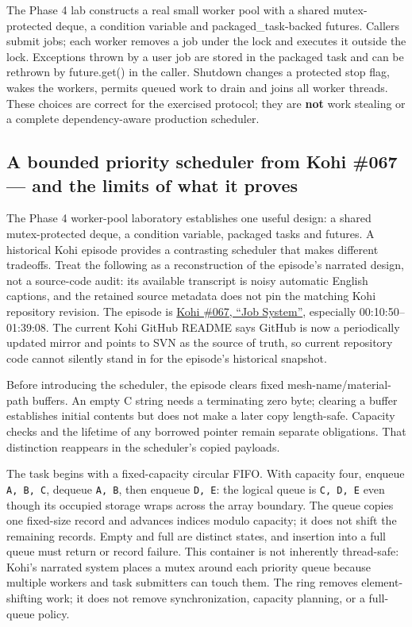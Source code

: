The Phase 4 lab constructs a real small worker pool with a shared mutex-protected deque, a condition variable and packaged\_task-backed futures. Callers submit jobs; each worker removes a job under the lock and executes it outside the lock. Exceptions thrown by a user job are stored in the packaged task and can be rethrown by future.get() in the caller. Shutdown changes a protected stop flag, wakes the workers, permits queued work to drain and joins all worker threads. These choices are correct for the exercised protocol; they are \textbf{not} work stealing or a complete dependency-aware production scheduler.

\subsection{A bounded priority scheduler from Kohi \#067 --- and the limits of what it proves}\label{05-engine-i-ch007-a-bounded-priority-scheduler-from-kohi-067-and-the-limits-of-what-it-proves}

The Phase 4 worker-pool laboratory establishes one useful design: a shared mutex-protected deque, a condition variable, packaged tasks and futures. A historical Kohi episode provides a contrasting scheduler that makes different tradeoffs. Treat the following as a reconstruction of the episode's narrated design, not a source-code audit: its available transcript is noisy automatic English captions, and the retained source metadata does not pin the matching Kohi repository revision. The episode is \href{https://www.youtube.com/watch?v=3JbLqoDubIY}{Kohi \#067, ``Job System''}, especially 00:10:50--01:39:08. The current Kohi GitHub README says GitHub is now a periodically updated mirror and points to SVN as the source of truth, so current repository code cannot silently stand in for the episode's historical snapshot.

Before introducing the scheduler, the episode clears fixed mesh-name/material-path buffers. An empty C string needs a terminating zero byte; clearing a buffer establishes initial contents but does not make a later copy length-safe. Capacity checks and the lifetime of any borrowed pointer remain separate obligations. That distinction reappears in the scheduler's copied payloads.

The task begins with a fixed-capacity circular FIFO. With capacity four, enqueue \texttt{A,\ B,\ C}, dequeue \texttt{A,\ B}, then enqueue \texttt{D,\ E}: the logical queue is \texttt{C,\ D,\ E} even though its occupied storage wraps across the array boundary. The queue copies one fixed-size record and advances indices modulo capacity; it does not shift the remaining records. Empty and full are distinct states, and insertion into a full queue must return or record failure. This container is not inherently thread-safe: Kohi's narrated system places a mutex around each priority queue because multiple workers and task submitters can touch them. The ring removes element-shifting work; it does not remove synchronization, capacity planning, or a full-queue policy.


